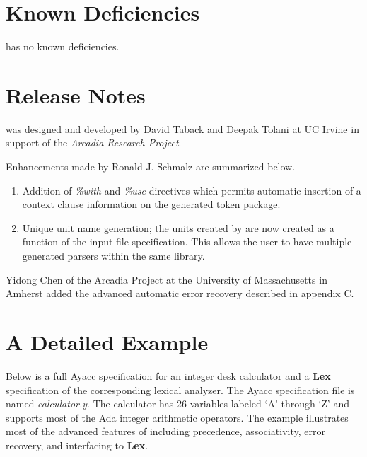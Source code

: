 \section{Known Deficiencies}
\ayacc has no known deficiencies.
\section{Release Notes}
\ayacc was designed and developed by David Taback and Deepak Tolani at
UC Irvine in support of the {\it Arcadia Research Project}.

Enhancements made by Ronald J. Schmalz are summarized below.
\begin{enumerate}
\item Addition of {\it \%with} and {\it \%use} directives which
permits automatic insertion of a context clause information on the
generated token package. 

\item Unique unit name generation; the units created by \ayacc are now
created as a function of the input file specification.  This allows
the user to have multiple \ayacc generated parsers within the same
library.
\end{enumerate}

Yidong Chen of the Arcadia Project at the University of Massachusetts
in Amherst added the advanced automatic error recovery described in
appendix C.
\newpage
\appendix
\section{A Detailed Example}
Below is a full Ayacc specification for an integer desk calculator and
a {\bf Lex} specification of the corresponding lexical analyzer.  The Ayacc
specification file is named {\it calculator.y}.  The calculator
has 26 variables labeled `A' through `Z' and supports most of the Ada
integer arithmetic operators.  The example illustrates most of the
advanced features of \ayacc including precedence, associativity,
error recovery, and interfacing to {\bf Lex}.

